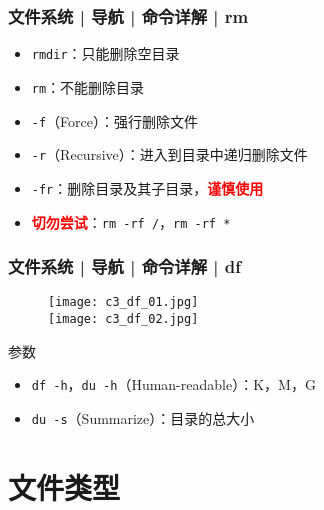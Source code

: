 \begin{frame}[fragile]
  \frametitle{文件系统 | 导航 | 命令详解 | \alert{rm}}
  \begin{itemize}[<+->]
    \item \verb|rmdir|：只能删除空目录
    \item \verb|rm|：不能删除目录
    \item \verb|-f|（Force）：强行删除文件
    \item \verb|-r|（Recursive）：进入到目录中递归删除文件
    \item \verb|-fr|：删除目录及其子目录，\textcolor{red}{\textbf{谨慎使用}}
    \item \textcolor{red}{\textbf{切勿尝试}}：\verb|rm -rf /|，\verb|rm -rf *|
  \end{itemize}
\end{frame}

\begin{frame}[fragile]
  \frametitle{文件系统 | 导航 | 命令详解 | \alert{df}}
  \begin{figure}
    \centering
    \texttt{[image: c3\_df\_01.jpg]}\\
    \texttt{[image: c3\_df\_02.jpg]}
  \end{figure}
  \vspace{-0.5cm}
  \begin{block}{参数}
    \begin{itemize}
      \item \verb|df -h|，\verb|du -h|（Human-readable）：K，M，G
      \item \verb|du -s|（Summarize）：目录的总大小
    \end{itemize}
  \end{block}
\end{frame}

\section{文件类型}
